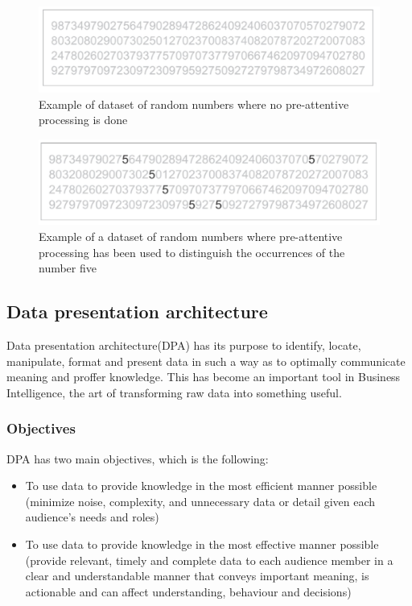 \begin{figure}[h!]
\includegraphics[scale=0.3]{attentive}
\caption{Example of dataset of random numbers where no pre-attentive processing is done}
\end{figure}

\begin{figure}[h!]
\includegraphics[scale=0.3]{pre_attentive}
\caption{Example of a dataset of random numbers where pre-attentive processing has been used to distinguish the occurrences of the number five}
\end{figure}
\subsection{Data presentation architecture}
Data presentation architecture(DPA) has its purpose to identify, locate, manipulate, format and present data in such a way as to optimally communicate meaning and proffer knowledge\cite{wiki_data_viz}. This has become an important tool in Business Intelligence, the art of transforming raw data into something useful. 

\subsubsection{Objectives}
DPA has two main objectives, which is the following:

\begin{itemize}
\item To use data to provide knowledge in the most efficient manner possible (minimize noise, complexity, and unnecessary data or detail given each audience's needs and roles)
\item To use data to provide knowledge in the most effective manner possible (provide relevant, timely and complete data to each audience member in a clear and understandable manner that conveys important meaning, is actionable and can affect understanding, behaviour and decisions)
\end{itemize}

